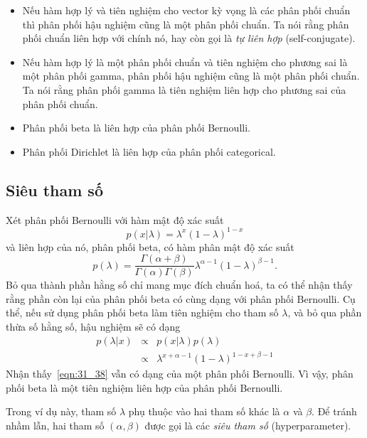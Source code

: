 \begin{itemize}
\item Nếu hàm hợp lý và tiên nghiệm cho vector kỳ vọng là các phân phối
chuẩn thì phân phối hậu nghiệm cũng là một phân phối chuẩn. Ta nói rằng phân
phối chuẩn liên hợp với chính nó, hay còn gọi là \textit{tự liên hợp} (self-conjugate).

\item Nếu hàm hợp lý là một phân phối chuẩn và tiên nghiệm
cho phương sai là một {phân phối gamma}, phân phối hậu nghiệm cũng là một phân phối chuẩn. Ta nói rằng phân phối gamma là tiên nghiệm liên hợp cho phương sai của phân phối chuẩn.

\item Phân phối beta là liên hợp của phân phối Bernoulli.

\item Phân phối Dirichlet là liên hợp của phân phối categorical.

\end{itemize}

\subsection{Siêu tham số}
Xét phân phối Bernoulli với hàm mật độ xác suất
\begin{equation}
p(x | \lambda) = \lambda^x ( 1 - \lambda)^{1 - x}
\end{equation}
và liên hợp của nó, phân phối beta, có hàm phân mật độ xác suất
\begin{equation}
p(\lambda) = \frac{\Gamma(\alpha + \beta)}{\Gamma(\alpha) \Gamma(\beta)} \lambda^{\alpha - 1} ( 1 - \lambda) ^{\beta - 1}.
\end{equation}
Bỏ qua thành phần hằng số chỉ mang mục đích chuẩn hoá, ta có thể nhận thấy rằng
phần còn lại của phân phối beta có cùng dạng với phân phối Bernoulli. Cụ thể,
nếu sử dụng phân phối beta làm tiên nghiệm cho tham số $\lambda$, và bỏ qua
phần thừa số hằng số, hậu nghiệm sẽ có dạng
\begin{eqnarray}
\nonumber
p(\lambda | x) & \propto & p(x | \lambda) p(\lambda) \\\
\label{eqn:31_38}
& \propto & \lambda^{x + \alpha - 1}(1 - \lambda)^{1 - x + \beta - 1}
\end{eqnarray}
Nhận thấy~\eqref{eqn:31_38} {vẫn có dạng của một phân phối
Bernoulli.} Vì vậy, phân phối beta là một tiên nghiệm liên hợp của phân phối Bernoulli.

Trong ví dụ này, tham số $\lambda$ phụ thuộc vào hai tham số khác là $\alpha$ và
$\beta$. Để tránh nhầm lẫn, hai tham số $(\alpha, \beta)$ được gọi là các
\textit{siêu tham số} (hyperparameter).

